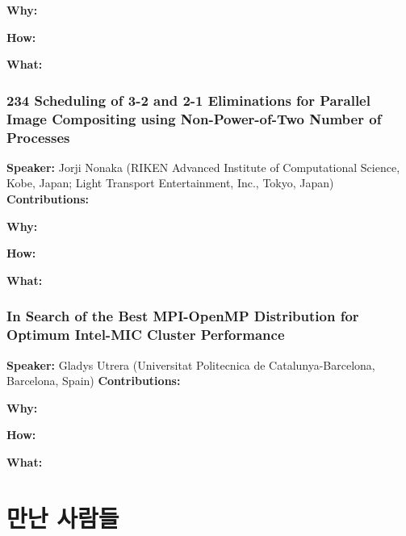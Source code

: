 \documentclass[twocolumn]{article}
\begin{document}
\noindent
\textbf{Why:}  

\noindent
\textbf{How:}  

\noindent
\textbf{What:}  

\subsubsection{234 Scheduling of 3-2 and 2-1 Eliminations for Parallel Image Compositing using Non-Power-of-Two Number of Processes}
\textbf{Speaker:} Jorji Nonaka (RIKEN Advanced Institute of Computational Science, Kobe, Japan; Light Transport Entertainment, Inc., Tokyo, Japan)
\noindent
\textbf{Contributions:}  

\noindent
\textbf{Why:}  

\noindent
\textbf{How:}  

\noindent
\textbf{What:}  

\subsubsection{In Search of the Best MPI-OpenMP Distribution for Optimum Intel-MIC Cluster Performance}
\textbf{Speaker:} Gladys Utrera (Universitat Politecnica de Catalunya-Barcelona, Barcelona, Spain)
\noindent
\textbf{Contributions:}  

\noindent
\textbf{Why:}  

\noindent
\textbf{How:}  

\noindent
\textbf{What:}  



\section{만난 사람들}
\end{document}
